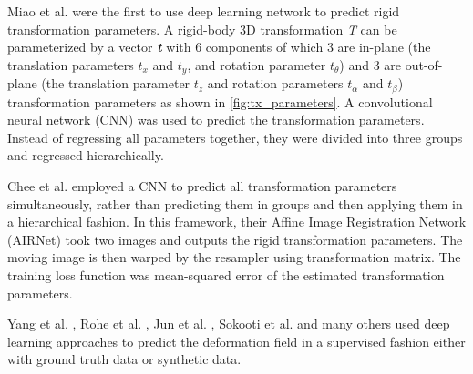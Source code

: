 \documentclass{report}
\begin{document}
	Miao et al. \cite{7393571} were the first to use deep learning network to predict rigid transformation parameters. A rigid-body 3D transformation \emph{T} can be parameterized by a vector \emph{\textbf{t}} with 6 components of which 3 are in-plane (the translation parameters \emph{\textbf{$t_x$}} and \emph{\textbf{$t_y$}}, and rotation parameter \emph{\textbf{$t_\theta$}}) and 3 are out-of-plane (the translation parameter \emph{\textbf{$t_z$}} and rotation parameters \emph{\textbf{$t_\alpha$}} and \emph{\textbf{$t_\beta$}}) transformation parameters as shown in \ref{fig:tx_parameters}. A convolutional neural network (CNN) was used to predict the transformation parameters. Instead of regressing all parameters together, they were divided into three groups and regressed hierarchically.
	
	
	
	
	Chee et al. \cite{https://doi.org/10.48550/arxiv.1810.02583} employed a CNN to predict all transformation parameters simultaneously, rather than predicting them in groups and then applying them in a hierarchical fashion. In this framework, their Affine Image Registration Network (AIRNet) took two images and outputs the rigid transformation parameters. The moving image is then warped by the resampler using transformation matrix. The training loss function was mean-squared error of the estimated transformation parameters.
	
	
	Yang et al. \cite{10.1007/978-3-319-46976-8_6}, Rohe et al. \cite{Roh2017SVFNetLD}, Jun et al. \cite{Jun}, Sokooti et al. \cite{10.1007/978-3-319-66182-7_27} and many others used deep learning approaches to predict the deformation field in a supervised fashion either with ground truth data or synthetic data.
	
\end{document}
